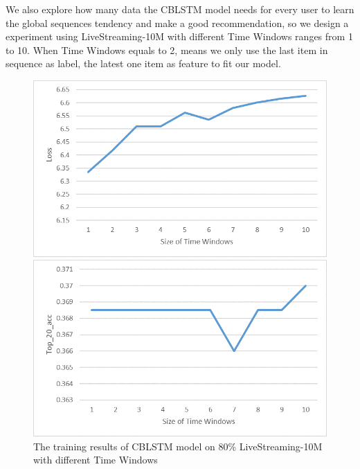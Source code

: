 \documentclass[runningheads]{llncs}
\begin{document}
We also explore how many data the CBLSTM model needs for every user to learn the global sequences tendency and make a good recommendation, so we design a experiment using LiveStreaming-10M with different Time Windows ranges from 1 to 10. When Time Windows equals to 2, means we only use the last item in sequence as label, the latest one item as feature to fit our model. 
\begin{figure}[!htb]
   \begin{minipage}{0.48\textwidth}
     \centering
     \includegraphics[width=\linewidth]{image/Loss_timewindows.png}
   \end{minipage}\hfill
   \begin {minipage}{0.48\textwidth}
     \centering
     \includegraphics[width=\linewidth]{image/Top_20_acc_timewindows.png}
   \end{minipage}
   \caption{The training results of CBLSTM model on 80\% LiveStreaming-10M with different Time Windows}
\end{figure}
\end{document}

